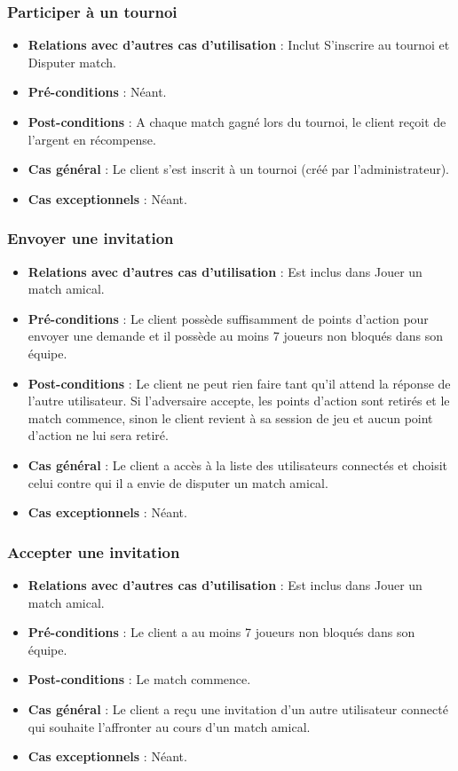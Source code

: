 \documentclass[a4paper,titlepage]{scrreprt}
\begin{document}
    \subsubsection{Participer à un tournoi}
      \begin{itemize}
        \item \textbf{Relations avec d'autres cas d'utilisation}  : Inclut S'inscrire au tournoi et Disputer match.
        \item \textbf{Pré-conditions} : Néant.
        \item \textbf{Post-conditions} : A chaque match gagné lors du tournoi, le client reçoit de l'argent en récompense.
        \item \textbf{Cas général} : Le client s'est inscrit à un tournoi (créé par l'administrateur).
        \item \textbf{Cas exceptionnels} : Néant.
      \end{itemize}

    \subsubsection{Envoyer une invitation}
      \begin{itemize}
        \item \textbf{Relations avec d'autres cas d'utilisation}  : Est inclus dans Jouer un match amical.
        \item \textbf{Pré-conditions} : Le client possède suffisamment de points d'action pour envoyer une demande et il possède au moins 7 joueurs non bloqués dans son équipe.
        \item \textbf{Post-conditions} : Le client ne peut rien faire tant qu'il attend la réponse de l'autre utilisateur. Si l'adversaire accepte, les points d'action sont retirés et le match commence, sinon le client revient à sa session de jeu et aucun point d'action ne lui sera retiré.
        \item \textbf{Cas général} : Le client a accès à la liste des utilisateurs connectés et choisit celui contre qui il a envie de disputer un match amical.
        \item \textbf{Cas exceptionnels} : Néant.
      \end{itemize}

    \subsubsection{Accepter une invitation}
      \begin{itemize}
        \item \textbf{Relations avec d'autres cas d'utilisation}  : Est inclus dans Jouer un match amical.
        \item \textbf{Pré-conditions} : Le client a au moins 7 joueurs non bloqués dans son équipe.
        \item \textbf{Post-conditions} : Le match commence.
        \item \textbf{Cas général} : Le client a reçu une invitation d'un autre utilisateur connecté qui souhaite l'affronter au cours d'un match amical.
        \item \textbf{Cas exceptionnels} : Néant.
      \end{itemize}
\end{document}
